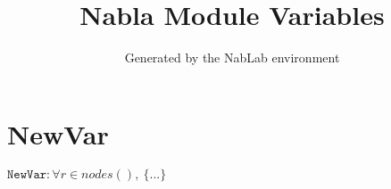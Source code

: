 \documentclass[11pt]{article}
\title{Nabla Module Variables}
\author{Generated by the NabLab environment}
\begin{document}
\maketitle


\section{NewVar}
$\texttt{NewVar} : \forall{r\in nodes()}, \ \{ ... \}$
\end{document}
